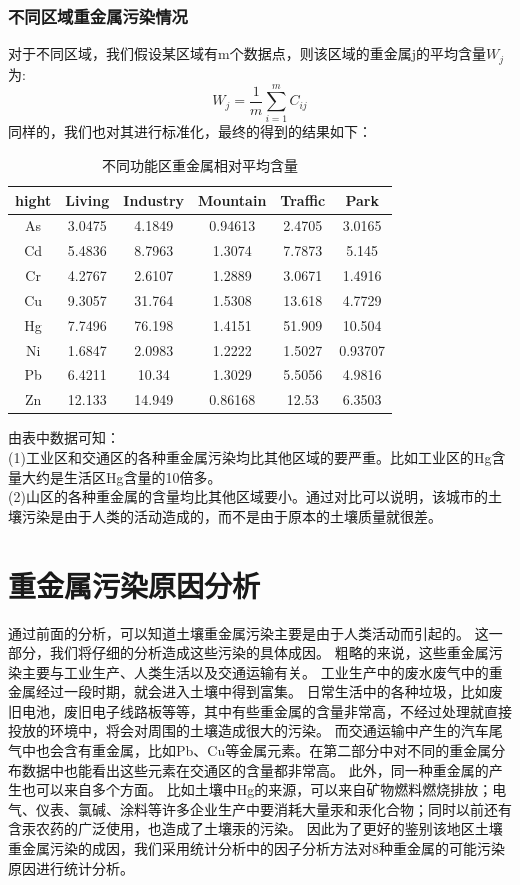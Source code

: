 \documentclass[a4paper]{article}
\begin{document}
\section{不同区域重金属污染情况}
对于不同区域，我们假设某区域有m个数据点，则该区域的重金属j的平均含量$W_j$为:
\begin{equation}
W_j=\frac{1}{m}\sum_{i=1}^m C_{ij}
\end{equation}
\indent 同样的，我们也对其进行标准化，最终的得到的结果如下：
\begin{table}[H]
		\centering
		\caption{不同功能区重金属相对平均含量}
		\label{average-contend}
		\begin{tabular}{c|ccccc}
			hight	  &    Living  &  Industry  &  Mountain  &  Traffic  &   Park    \\
			\hline
			As   & 3.0475  &  4.1849   &   0.94613   &  2.4705   &   3.0165      \\
    			Cd   & 5.4836  &  8.7963   &    1.3074   &  7.7873   &    5.145		\\
    			Cr   & 4.2767  &  2.6107   &    1.2889   &  3.0671   &   1.4916		\\
    			Cu   & 9.3057  &  31.764   &    1.5308   &  13.618   &   4.7729		\\
    			Hg   & 7.7496  &  76.198   &    1.4151   &  51.909   &   10.504		\\
    			Ni   & 1.6847  &  2.0983   &    1.2222   &  1.5027   &  0.93707		\\
    			Pb   & 6.4211  &   10.34   &    1.3029   &  5.5056   &   4.9816		\\
    			Zn   & 12.133  &  14.949   &   0.86168   &   12.53   &   6.3503		\\
		\end{tabular}
	\end{table}
由表中数据可知： \\
\indent (1)工业区和交通区的各种重金属污染均比其他区域的要严重。比如工业区的Hg含量大约是生活区Hg含量的10倍多。                                \\
\indent (2)山区的各种重金属的含量均比其他区域要小。通过对比可以说明，该城市的土壤污染是由于人类的活动造成的，而不是由于原本的土壤质量就很差。     \\

\part{重金属污染原因分析}
通过前面的分析，可以知道土壤重金属污染主要是由于人类活动而引起的。
这一部分，我们将仔细的分析造成这些污染的具体成因。
粗略的来说，这些重金属污染主要与工业生产、人类生活以及交通运输有关。
工业生产中的废水废气中的重金属经过一段时期，就会进入土壤中得到富集。
日常生活中的各种垃圾，比如废旧电池，废旧电子线路板等等，其中有些重金属的含量非常高，不经过处理就直接投放的环境中，将会对周围的土壤造成很大的污染。
而交通运输中产生的汽车尾气中也会含有重金属，比如Pb、Cu等金属元素。在第二部分中对不同的重金属分布数据中也能看出这些元素在交通区的含量都非常高。
此外，同一种重金属的产生也可以来自多个方面。
比如土壤中Hg的来源，可以来自矿物燃料燃烧排放；电气、仪表、氯碱、涂料等许多企业生产中要消耗大量汞和汞化合物；同时以前还有含汞农药的广泛使用，也造成了土壤汞的污染。
\indent 因此为了更好的鉴别该地区土壤重金属污染的成因，我们采用统计分析中的因子分析方法对8种重金属的可能污染原因进行统计分析。
\end{document}
